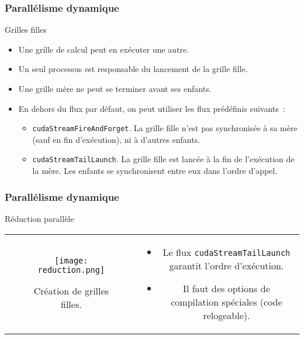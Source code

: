 \begin{frame}
    \frametitle{Parallélisme dynamique}
\begin{block}{Grilles filles}
 \begin{itemize}
    \item<+-> Une grille de calcul peut en exécuter une autre.
    \item<+-> Un seul processus est responsable du lancement de la grille fille.
    \item<+-> Une grille mère ne peut se terminer avant ses enfants.
    \item<+-> En dehors du flux par défaut, on peut utiliser les flux prédéfinis suivants~:
    \begin{itemize}
        \item<+-> \texttt{cudaStreamFireAndForget}. La grille fille n'est pas synchronisée à sa mère (sauf en fin d'exécution), ni à d'autres enfants.
        \item<+-> \texttt{cudaStreamTailLaunch}. La grille fille est lancée à la fin de l'exécution de la mère. Les enfants se synchronisent entre eux dans l'ordre
        d'appel.
    \end{itemize}
 \end{itemize} 
\end{block}
\end{frame}\begin{frame}
    \frametitle{Parallélisme dynamique}
    \begin{block}{Réduction parallèle}
        \begin{tabular}{cc}
             \begin{minipage}{0.45\textwidth}
      \begin{figure}[htbp]
         \centering
        \texttt{[image: reduction.png]}
         \caption{Création de grilles filles.}
         \label{fig:reduction}
     \end{figure}
             \end{minipage} & 
             \begin{minipage}{0.45\textwidth}
                 \begin{itemize}
                     \item<+-> Le flux \texttt{cudaStreamTailLaunch} garantit l'ordre d'exécution.
                     \item<+-> Il faut des options de compilation spéciales (code relogeable).
                \end{itemize}
             \end{minipage}
     \end{tabular}
     \end{block}
\end{frame}